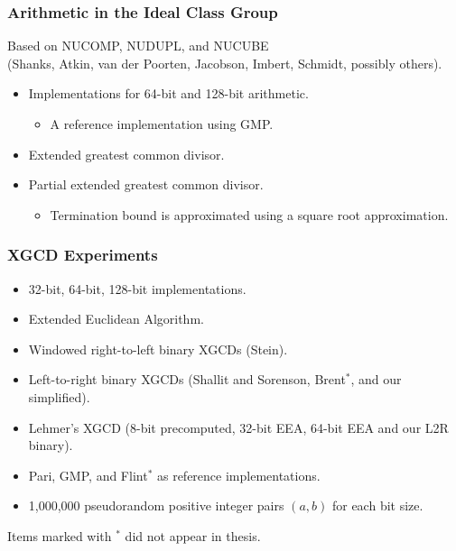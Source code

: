 \documentclass{beamer}
\newcommand{\smallfont}{\fontsize{6pt}{7.2}\selectfont}
\begin{document}
  
\begin{frame}
\frametitle{Arithmetic in the Ideal Class Group}
Based on NUCOMP, NUDUPL, and NUCUBE \\(Shanks, Atkin, van der Poorten, Jacobson, Imbert, Schmidt, possibly others). %

\begin{itemize}
\item Implementations for 64-bit and 128-bit arithmetic.
	\begin{itemize}
	\item A reference implementation using GMP.
	\end{itemize}
\item Extended greatest common divisor.
\item Partial extended greatest common divisor.
	\begin{itemize}
	\item Termination bound is approximated using a square root approximation.
	\end{itemize}
\end{itemize}

\end{frame}

\begin{frame}
\frametitle{XGCD Experiments}
\begin{itemize}
\item 32-bit, 64-bit, 128-bit implementations.
\item Extended Euclidean Algorithm.
\item Windowed right-to-left binary XGCDs (Stein).
\item Left-to-right binary XGCDs (Shallit and Sorenson, Brent${}^{*}$, and our simplified).
\item Lehmer's XGCD (8-bit precomputed, 32-bit EEA, 64-bit EEA and our L2R binary).
\item Pari, GMP, and Flint${}^{*}$ as reference implementations.
\item 1,000,000 pseudorandom positive integer pairs $(a,b)$ for each bit size.
\end{itemize}

\smallfont
Items marked with ${}^{*}$ did not appear in thesis.
\end{frame}
\end{document}
